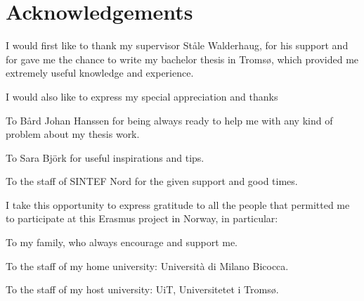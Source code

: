 \clearpage 
\chapter{Acknowledgements}

I would first like to thank my supervisor Ståle Walderhaug, for his support and for gave me the chance to write my bachelor thesis in Tromsø, which provided me extremely useful knowledge and experience.

\vspace{+0.5cm}

I would also like to express my special appreciation and thanks 

\hspace{1cm} To Bård Johan Hanssen for being always ready to help me with any kind of \hspace{1cm}problem about my thesis work.

\hspace{1cm} To Sara Björk for useful inspirations and tips. 

\hspace{1cm}  To the staff of SINTEF Nord for the given support and good times. 

\vspace{+0.5cm}
 
I take this opportunity to express gratitude to all the people that permitted me to participate at this Erasmus project in Norway, in particular:

\hspace{1cm} To my family, who always encourage and support me.

\hspace{1cm}  To the staff of my home university: Università di Milano Bicocca.

\hspace{1cm}  To the staff of my host university: UiT, Universitetet i Tromsø.

 	 
 	 
 	 


